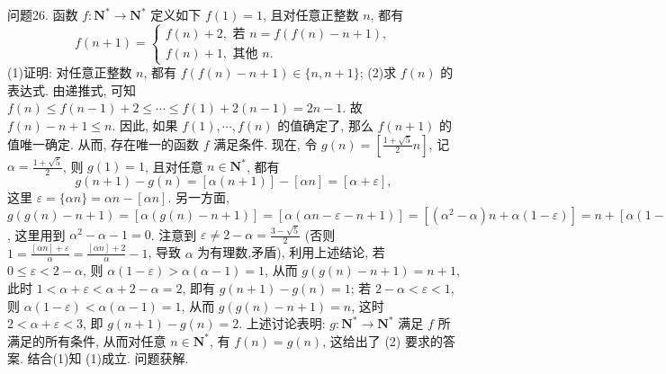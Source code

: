 问题26. 函数 $f: \mathbf{N}^* \rightarrow \mathbf{N}^*$ 定义如下 $f(1)=1$, 且对任意正整数 $n$, 都有
$$
f(n+1)=\left\{\begin{array}{l}
f(n)+2, \text { 若 } n=f(f(n)-n+1), \\
f(n)+1, \text { 其他 } n .
\end{array}\right.
$$
(1)证明: 对任意正整数 $n$, 都有 $f(f(n)-n+1) \in\{n, n+1\}$;
(2)求 $f(n)$ 的表达式.
由递推式, 可知 $f(n) \leqslant f(n-1)+2 \leqslant \cdots \leqslant f(1)+2(n-1)= 2 n-1$. 故 $f(n)-n+1 \leqslant n$. 因此, 如果 $f(1), \cdots, f(n)$ 的值确定了, 那么 $f(n+1)$ 的值唯一确定.
从而, 存在唯一的函数 $f$ 满足条件.
现在, 令 $g(n)=\left[\frac{1+\sqrt{5}}{2} n\right]$, 记 $\alpha=\frac{1+\sqrt{5}}{2}$, 则 $g(1)=1$, 且对任意 $n \in \mathbf{N}^*$, 都有
$$
g(n+1)-g(n)=[\alpha(n+1)]-[\alpha n]=[\alpha+\varepsilon],
$$
这里 $\varepsilon=\{\alpha n\}=\alpha n-[\alpha n]$.
另一方面, $g(g(n)-n+1)=[\alpha(g(n)-n+1)]=[\alpha(\alpha n-\varepsilon-n+1)]= \left[\left(\alpha^2-\alpha\right) n+\alpha(1-\varepsilon)\right]=n+[\alpha(1-\varepsilon)]$, 这里用到 $\alpha^2-\alpha-1=0$.
注意到 $\varepsilon \neq 2-\alpha=\frac{3-\sqrt{5}}{2}$ (否则 $1=\frac{[\alpha n]+\varepsilon}{\alpha}=\frac{[\alpha n]+2}{\alpha}-1$, 导致 $\alpha$ 为有理数,矛盾), 利用上述结论, 若 $0 \leqslant \varepsilon<2-\alpha$, 则 $\alpha(1-\varepsilon)>\alpha(\alpha-1)=1$,
从而 $g(g(n)-n+1)=n+1$, 此时 $1<\alpha+\varepsilon<\alpha+2-\alpha=2$, 即有 $g(n+ 1)-g(n)=1$; 若 $2-\alpha<\varepsilon<1$, 则 $\alpha(1-\varepsilon)<\alpha(\alpha-1)=1$, 从而 $g(g(n)- n+1)=n$, 这时 $2<\alpha+\varepsilon<3$, 即 $g(n+1)-g(n)=2$.
上述讨论表明: $g: \mathbf{N}^* \rightarrow \mathbf{N}^*$ 满足 $f$ 所满足的所有条件, 从而对任意 $n \in \mathbf{N}^*$, 有 $f(n)=g(n)$, 这给出了 (2) 要求的答案.
结合(1)知 (1)成立.
问题获解.



